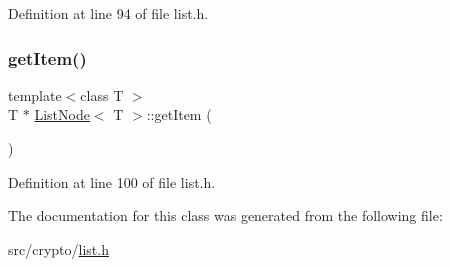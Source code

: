 Definition at line 94 of file list.\+h.

\mbox{\label{classListNode_addc19839da16898dbc1d8abfd8ec5dcd}} 
\subsubsection{\texorpdfstring{get\+Item()}{getItem()}}
{\footnotesize\ttfamily template$<$class T $>$ \\
T $\ast$ \hyperlink{classListNode}{List\+Node}$<$ T $>$\+::get\+Item (\begin{DoxyParamCaption}{ }\end{DoxyParamCaption})}



Definition at line 100 of file list.\+h.



The documentation for this class was generated from the following file\+:\begin{DoxyCompactItemize}
\item 
src/crypto/\hyperlink{list_8h}{list.\+h}\end{DoxyCompactItemize}
